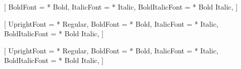 %
%
%
%

\usepackage{xcolor}
\usepackage{fontspec}
\usepackage{graphicx}
\usepackage{fancyhdr}
\usepackage{hyperref}


\setmainfont{Crimson Pro}[
  BoldFont       = * Bold,
  ItalicFont     = * Italic,
  BoldItalicFont = * Bold Italic,
]

\setsansfont{Red Hat Display}[
  UprightFont    = * Regular,
  BoldFont       = * Bold,
  ItalicFont     = * Italic,
  BoldItalicFont = * Bold Italic,
]

\newfontfamily{}[
  UprightFont    = * Regular,
  BoldFont       = * Bold,
  ItalicFont     = * Italic,
  BoldItalicFont = * Bold Italic,
]

\hypersetup{
  colorlinks = true,
  linkcolor  = BadgerRed,
  urlcolor   = BadgerRed,
}


